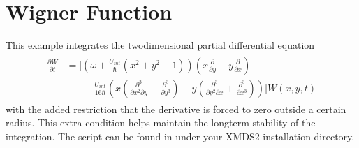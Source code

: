 \documentclass[letterpaper,10pt,english]{sphinxmanual}
\begin{document}
\section{Wigner Function}
\label{\detokenize{worked_examples:wigner-function}}\label{\detokenize{worked_examples:wignerarguments}}
\sphinxAtStartPar
This example integrates the two\sphinxhyphen{}dimensional partial differential equation
\begin{equation*}
\begin{split}\begin{split}
\frac{\partial W}{\partial t} &= \Bigg[ \left(\omega + \frac{U_{int}}{\hbar}\left(x^2+y^2-1\right)\right) \left(x \frac{\partial}{\partial y}
- y \frac{\partial}{\partial x}\right)\\
&\phantom{=\Bigg[} - \frac{U_{int}}{16 \hbar}\left(x\left(\frac{\partial^3}{\partial x^2 \partial y}
+\frac{\partial^3}{\partial y^3}\right)-y\left(\frac{\partial^3}{\partial y^2 \partial x}+\frac{\partial^3}{\partial x^3}\right)\right)\Bigg]W(x,y,t)
\end{split}\end{split}
\end{equation*}
\sphinxAtStartPar
with the added restriction that the derivative is forced to zero outside a certain radius.  This extra condition helps maintain the long\sphinxhyphen{}term stability of the integration. The script can be found in  under your XMDS2 installation directory.
\end{document}
